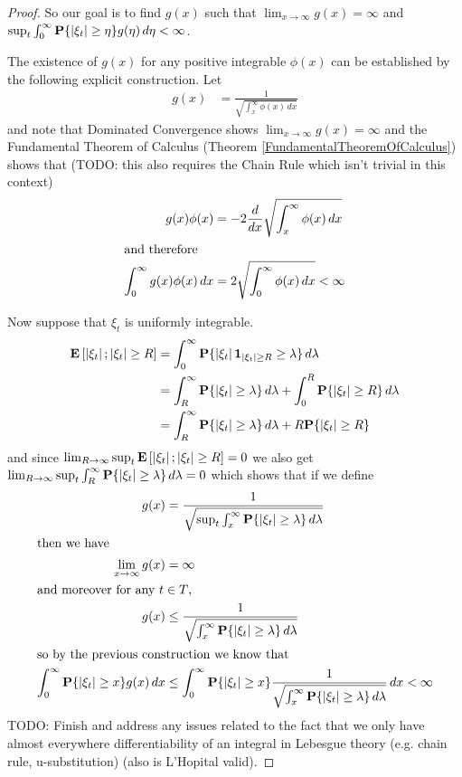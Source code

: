 \begin{proof}
So our goal is to find $g(x)$ such that $\lim_{x \to \infty} g(x) =
\infty$ and $\sup_t \int_0^\infty \textbf{P}\{\left \vert \xi_t \right \vert \geq \eta\}
g(\eta) \, d\eta < \infty$.

The existence of $g(x)$ for any positive integrable $\phi(x)$ can be
established by the following explicit construction.  Let 
\begin{align*}
g(x) &=
\frac{1}{\sqrt{\int_x^\infty \phi(x) \, dx}}
\end{align*}
and note that Dominated Convergence shows $\lim_{x \to \infty} g(x) =
\infty$ and the Fundamental Theorem of Calculus (Theorem
\ref{FundamentalTheoremOfCalculus}) shows that (TODO: this also requires the Chain Rule
which isn't trivial in this context)
\begin{align*}
g(x) \phi(x)  &= -2 \frac{d}{dx} \sqrt{\int_x^\infty \phi(x) \, dx} \\
\intertext{and therefore}
\int_0^\infty g(x) \phi(x) \, dx &= 2 \sqrt{\int_0^\infty \phi(x) \,
  dx} < \infty
\end{align*}


Now suppose that $\xi_t$ is uniformly integrable.
\begin{align*}
\textbf{E}\left[\left \vert \xi_t \right \vert ; \left \vert \xi_t \right \vert \geq R\right] &= 
\int_0^\infty \textbf{P}\{\left \vert \xi_t \right \vert \textbf{1}_{\left \vert \xi_t \right \vert
    \geq R} \geq \lambda\} \,
d\lambda \\
&= \int_R^\infty \textbf{P}\{\left \vert \xi_t \right \vert \geq \lambda\} \,
d\lambda + 
\int_0^R \textbf{P}\{\left \vert \xi_t \right \vert \geq R\} \, d\lambda \\
&= \int_R^\infty \textbf{P}\{\left \vert \xi_t \right \vert \geq \lambda\} \,
d\lambda + 
R \textbf{P}\{\left \vert \xi_t \right \vert \geq R\} 
\end{align*}
and since $\lim_{R \to \infty} \sup_t \textbf{E}\left[\left \vert \xi_t \right \vert ;
  \left \vert \xi_t \right \vert \geq R\right] = 0$ we also get $\lim_{R \to \infty} \sup_t \int_R^\infty \textbf{P}\{\left \vert \xi_t \right \vert \geq \lambda\} \,
d\lambda = 0$
which shows that if we define 
\begin{align*}
g(x) &= \frac{1}{\sqrt{\sup_t \int_x^\infty \textbf{P}\{\left \vert \xi_t \right \vert \geq \lambda\} \,
d\lambda}} \\
\intertext{then we have}
\lim_{x \to \infty} g(x) &= \infty \\
\intertext{and moreover for any $t \in T$, }
g(x) &\leq
\frac{1}{\sqrt{\int_x^\infty \textbf{P}\{\left \vert \xi_t \right \vert \geq \lambda\} \,
    d\lambda}}\\
\intertext{so by the previous construction we know that}
\int_0^\infty \textbf{P}\{\left \vert \xi_t \right \vert \geq x\} g(x) \, dx 
&\leq \int_0^\infty \textbf{P}\{\left \vert \xi_t \right \vert \geq x\} 
\frac{1}{\sqrt{\int_x^\infty \textbf{P}\{\left \vert \xi_t \right \vert \geq \lambda\} \,
d\lambda}} \, dx < \infty
\end{align*}
TODO: Finish and address any issues related to the fact that we only
have almost everywhere differentiability of an integral in Lebesgue
theory (e.g. chain rule, u-substitution) (also is L'Hopital valid).
\end{proof}

